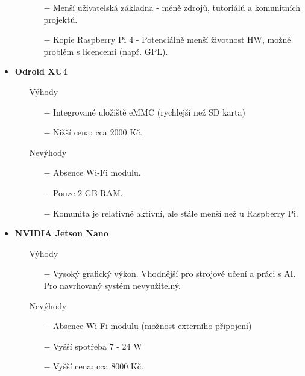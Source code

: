 \begin{itemize}
\begin{itemize}
\begin{itemize}
                \item[$-$] Menší uživatelská základna - méně zdrojů, tutoriálů a komunitních projektů.
                \item[$-$] Kopie Raspberry Pi 4 - Potenciálně menší životnost HW, možné problém s licencemi (např. GPL).
            \end{itemize}
        \end{itemize}
    \item \textbf{Odroid XU4}
        \begin{itemize}
        \item[] Výhody
            \begin{itemize}
                \item[$-$] Integrované uložiště eMMC (rychlejší než SD karta)
                \item[$-$] Nižší cena: cca 2000 Kč.
            \end{itemize}
        \item[] Nevýhody
            \begin{itemize}
                \item[$-$] Absence Wi-Fi modulu.
                \item[$-$] Pouze 2 GB RAM.
                \item[$-$] Komunita je relativně aktivní, ale stále menší než u Raspberry Pi.
            \end{itemize}
        \end{itemize}
    \item \textbf{NVIDIA Jetson Nano} 
        \begin{itemize}
            \item[] Výhody
            \begin{itemize}
                \item[$-$] Vysoký grafický výkon. Vhodnější pro strojové učení a práci s AI. Pro navrhovaný systém nevyužitelný.
            \end{itemize}
            \item[] Nevýhody
            \begin{itemize}
                \item[$-$] Absence Wi-Fi modulu (možnost externího připojení)
                \item[$-$] Vyšší spotřeba 7 - 24 W
                \item[$-$] Vyšší cena: cca 8000 Kč.
            \end{itemize}

\end{itemize}
\end{itemize}
